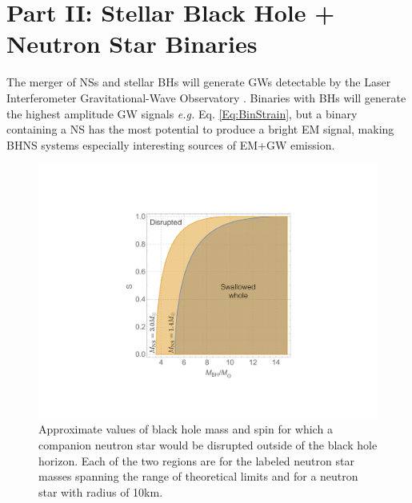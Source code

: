 \section{Part II: Stellar Black Hole + Neutron Star Binaries}
%

The merger of NSs and stellar BHs will generate GWs detectable by the Laser
Interferometer Gravitational-Wave Observatory \citep[LIGO][]{aLIGO:2015}.
Binaries with BHs will generate the highest amplitude GW signals \emph{e.g.}
Eq. \ref{Eq:BinStrain}, but a binary containing a NS has the most potential to
produce a bright EM signal, making BHNS systems especially interesting sources
of EM+GW emission.


\begin{figure}
\begin{center}
\includegraphics[scale=0.33]{figures/ch0/BHNS_TDs} 
\end{center}
\caption{Approximate values of black hole mass and spin for which a companion neutron star would be disrupted outside of the black hole horizon. Each of the two regions are for the labeled neutron star masses spanning the range of theoretical limits and for a neutron star with radius of 10km.}
\label{Fig:Contour}
\end{figure}

